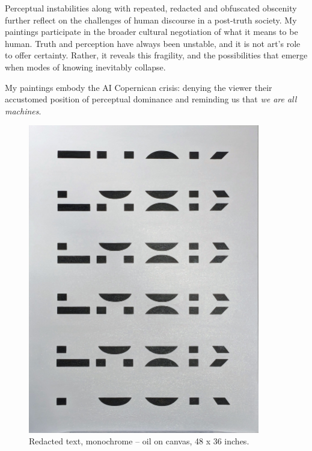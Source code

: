 \documentclass[12pt]{article}
\begin{document}
Perceptual instabilities along with repeated, redacted and obfuscated
obscenity further reflect on the challenges of human discourse in a
post-truth society. My paintings participate in the broader cultural
negotiation of what it means to be human. Truth and perception have
always been unstable, and it is not art's role to offer
certainty. Rather, it reveals this fragility, and the possibilities
that emerge when modes of knowing inevitably collapse.

My paintings embody the AI Copernican crisis:
denying the viewer their accustomed position of perceptual dominance
and reminding us that \emph{we are all machines}.

\newpage
\begin{figure}[htbp]
  \centering
  \includegraphics*[width=0.9\textwidth]{black.jpg}
  \caption{Redacted text, monochrome -- oil on canvas, 48 x 36 inches.}
  \label{fig:black}
\end{figure}
\end{document}
